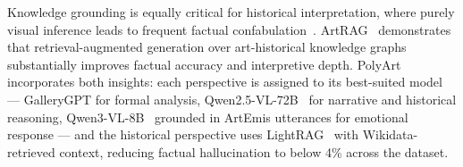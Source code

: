 Knowledge grounding is equally critical for historical interpretation, where purely visual inference leads to frequent factual confabulation~\cite{llm_Hallucination_2023}.
ArtRAG~\cite{ArtRAG_MM2025} demonstrates that retrieval-augmented generation over art-historical knowledge graphs substantially improves factual accuracy and interpretive depth.
PolyArt incorporates both insights: each perspective is assigned to its best-suited model --- GalleryGPT for formal analysis, Qwen2.5-VL-72B~\cite{qwen2vl} for narrative and historical reasoning, Qwen3-VL-8B~\cite{bai2025qwen3vltechnicalreport} grounded in ArtEmis utterances for emotional response --- and the historical perspective uses LightRAG~\cite{guo2024lightragsimplefastretrievalaugmented} with Wikidata-retrieved context, reducing factual hallucination to below 4\% across the dataset.
